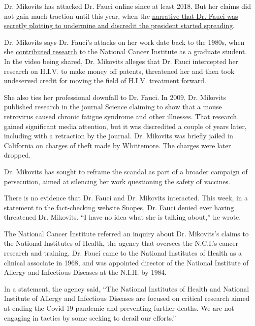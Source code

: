 Dr. Mikovits has attacked Dr. Fauci online since at least 2018. But her
claims did not gain much traction until this year, when the
\href{https://www.nytimes3xbfgragh.onion/2020/03/28/technology/coronavirus-fauci-trump-conspiracy-target.html}{narrative
that Dr. Fauci was secretly plotting to undermine and discredit the
president started spreading}.

Dr. Mikovits says Dr. Fauci's attacks on her work date back to the
1980s, when she
\href{https://nyaspubs.onlinelibrary.wiley.com/doi/abs/10.1111/j.1749-6632.1990.tb16119.x}{contributed
research} to the National Cancer Institute as a graduate student. In the
video being shared, Dr. Mikovits alleges that Dr. Fauci intercepted her
research on H.I.V. to make money off patents, threatened her and then
took undeserved credit for moving the field of H.I.V. treatment forward.

She also ties her professional downfall to Dr. Fauci. In 2009, Dr.
Mikovits published research in the journal Science claiming to show that
a mouse retrovirus caused chronic fatigue syndrome and other illnesses.
That research gained significant media attention, but it was discredited
a couple of years later, including with a retraction by the journal. Dr.
Mikovits was briefly jailed in California on charges of theft made by
Whittemore. The charges were later dropped.

Dr. Mikovits has sought to reframe the scandal as part of a broader
campaign of persecution, aimed at silencing her work questioning the
safety of vaccines.

There is no evidence that Dr. Fauci and Dr. Mikovits interacted. This
week, in a
\href{https://www.snopes.com/fact-check/scientist-vaccine-jailed/}{statement
to the fact-checking website Snopes}, Dr. Fauci denied ever having
threatened Dr. Mikovits. ``I have no idea what she is talking about,''
he wrote.

The National Cancer Institute referred an inquiry about Dr. Mikovits's
claims to the National Institutes of Health, the agency that oversees
the N.C.I.'s cancer research and training. Dr. Fauci came to the
National Institutes of Health as a clinical associate in 1968, and was
appointed director of the National Institute of Allergy and Infectious
Diseases at the N.I.H. by 1984.

In a statement, the agency said, ``The National Institutes of Health and
National Institute of Allergy and Infectious Diseases are focused on
critical research aimed at ending the Covid-19 pandemic and preventing
further deaths. We are not engaging in tactics by some seeking to derail
our efforts.''

